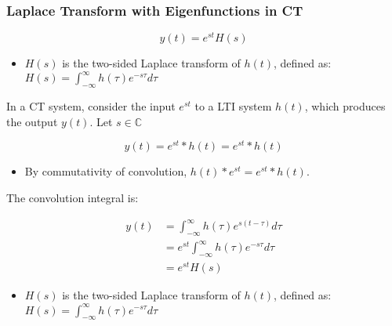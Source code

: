 \subsubsection{Laplace Transform with Eigenfunctions in CT}
\begin{definition}
    \begin{equation}
        y(t) = e^{st} H(s)
    \end{equation}
    \begin{itemize}
        \item \( H(s) \) is the two-sided Laplace transform of \( h(t) \), defined as: $H(s) = \int_{-\infty}^{\infty} h(\tau) e^{-s\tau} d\tau$
    \end{itemize}
\end{definition}
\begin{derivation}
    In a CT system, consider the input \( e^{st} \) to a LTI system \( h(t) \), which produces the output \( y(t) \). Let $s \in \mathbb{C}$

    \begin{center}
    \end{center}

    \[
    y(t) = e^{st} \ast h(t) = e^{st} \ast h(t)
    \]

    \begin{itemize}
        \item By commutativity of convolution, \( h(t) \ast e^{st} = e^{st} \ast h(t) \).
    \end{itemize}
    \vspace{1em}

    The convolution integral is:

    \begin{align*}
    y(t) &= \int_{-\infty}^{\infty} h(\tau) e^{s(t-\tau)} d\tau \\
    &= e^{st} \int_{-\infty}^{\infty} h(\tau) e^{-s\tau} d\tau \\
    &= e^{st} H(s)
    \end{align*}

    \begin{itemize}
        \item \( H(s) \) is the two-sided Laplace transform of \( h(t) \), defined as: $H(s) = \int_{-\infty}^{\infty} h(\tau) e^{-s\tau} d\tau$
    \end{itemize}
    \vspace{1em}


\end{derivation}
